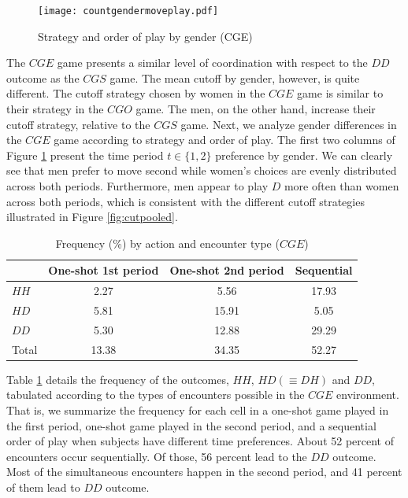 \documentclass[11pt,english]{article}
\begin{document}
\begin{center}
\begin{figure}[ht]
\centering{}%
\texttt{[image: countgendermoveplay.pdf]}%
\caption{Strategy and order of play by gender (CGE)} 
\label{fig:cgepooled}
\end{figure}
\end{center}

The $CGE$ game presents a similar level of coordination with respect to the $DD$ outcome as the $CGS$ game. The mean cutoff by gender, however, is quite different. The cutoff strategy chosen by women in the $CGE$ game is similar to their strategy in the $CGO$ game. The men, on the other hand, increase their cutoff strategy, relative to the $CGS$ game. Next, we analyze gender differences in the $CGE$ game according to strategy and order of play. The first two columns of Figure \ref{fig:cgepooled} present the time period $t\in\{1,2\}$ preference by gender. We can clearly see that men prefer to move second while women's choices are evenly distributed across both periods. Furthermore, men appear to play $D$ more often than women across both periods, which is consistent with the different cutoff strategies illustrated in Figure \ref{fig:cutpooled}.

\begin{table}[!t]
\centering\caption{Frequency (\%) by action and encounter type ($CGE$)}

\begin{tabular}{lccc}
\hline
 & One-shot 1st period & One-shot 2nd period  & Sequential\\
  \hline
  $HH$ &  2.27 & 5.56 & 17.93 \\
  $HD$ & 5.81 & 15.91 & 5.05 \\
  $DD$& 5.30 & 12.88 & 29.29 \\
  \hline
Total & 13.38 & 34.35 & 52.27\\
\end{tabular}

\label{tab(CGE)}
\end{table}

Table \ref{tab(CGE)} details the frequency of the outcomes, $HH$, $HD(\equiv DH)$ and $DD$, tabulated according to the types of encounters possible in the $CGE$ environment. That is, we summarize the frequency for each cell in a one-shot game played in the first period, one-shot game played in the second period, and a sequential order of play when subjects have different time preferences. About 52 percent of encounters occur sequentially. Of those, 56 percent lead to the $DD$ outcome. Most of the simultaneous encounters happen in the second period, and 41 percent of them lead to $DD$ outcome.  \\
\end{document}
